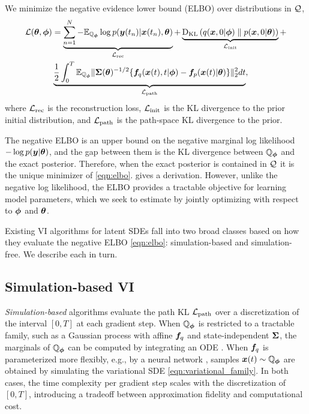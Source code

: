 We minimize the negative evidence lower bound (ELBO) over distributions in $\mathcal{Q}$,
\begin{equation}\label{eqn:elbo}
\begin{aligned}
   \mathcal{L}(\boldsymbol{\theta},\boldsymbol{\phi}) &= \underbrace{\sum_{n=1}^N {-}\mathbb{E}_{\mathbb{Q}_{\boldsymbol{\phi}}} \log p(\boldsymbol{y}(t_n) | \boldsymbol{x}(t_n), \boldsymbol{\theta})}_{\mathcal{L}_{\mathrm{rec}}} 
   + \underbrace{\textrm{D}_{\textrm{KL}}\left(q(\boldsymbol{x}, 0 | \boldsymbol{\phi})\;\|\;p(\boldsymbol{x}, 0 | \boldsymbol{\theta})\right)}_{\mathcal{L}_{\mathrm{init}}}  + \\
   &\underbrace{\frac{1}{2}\int_0^{T} \mathbb{E}_{\mathbb{Q}_{\boldsymbol{\phi}}} \|\boldsymbol{\Sigma}(\boldsymbol{\theta})^{-1/2}\{\boldsymbol{f}_q(\boldsymbol{x}(t), t | \boldsymbol{\phi}) - \boldsymbol{f}_p(\boldsymbol{x}(t)| \boldsymbol{\theta})\}\|_2^2 dt}_{\mathcal{L}_{\mathrm{path}}},
\end{aligned}
\end{equation}
where $\mathcal{L}_{\mathrm{rec}}$ is the reconstruction loss, $\mathcal{L}_{\mathrm{init}}$ is the KL divergence to the prior initial distribution, and $\mathcal{L}_{\mathrm{path}}$ is the path-space KL divergence to the prior.

The negative ELBO is an upper bound on the negative marginal log likelihood $-\log p(\boldsymbol{y} | \boldsymbol{\theta})$, and the gap between them is the KL divergence between $\mathbb{Q}_{\boldsymbol{\phi}}$ and the exact posterior.
Therefore, when the exact posterior is contained in $\mathcal{Q}$ it is the unique minimizer of \cref{eqn:elbo}.
 gives a derivation.
However, unlike the negative log likelihood, the ELBO provides a tractable objective for learning  model parameters, which we seek to estimate by jointly optimizing with respect to $\boldsymbol{\phi}$ and $\boldsymbol{\theta}$.

Existing VI algorithms for latent SDEs fall into two broad classes based on how they evaluate the negative ELBO \cref{eqn:elbo}: simulation-based and simulation-free.
We describe each in turn.

\subsection{Simulation-based VI}\label{subsec:sim-based}
\emph{Simulation-based} algorithms evaluate the path KL $\mathcal{L}_{\mathrm{path}}$ over a discretization of the interval $[0, T]$ at each gradient step. 
When $\mathbb{Q}_{\boldsymbol{\phi}}$ is restricted to a tractable family, such as a Gaussian process with affine $\boldsymbol{f}_q$ and state-independent $\boldsymbol{\Sigma}$, the marginals of $\mathbb{Q}_{\boldsymbol{\phi}}$ can be computed by integrating an ODE \cite{archambeau2007gaussian, hu2025sing,archambeau2007variational, duncker2019learning, verma2024variational, kohs2021variational, wildner2021moment,park2024amortized, parkstochastic2026}.
When $\boldsymbol{f}_q$ is parameterized more flexibly, e.g., by a neural network \cite{li2020scalable, ryder2018black, tzen2019neural, kidger2021efficient, oh2024stable}, samples $\boldsymbol{x}(t) \sim \mathbb{Q}_{\boldsymbol{\phi}}$ are obtained by simulating the variational SDE \eqref{eqn:variational_family}. 
In both cases, the time complexity per gradient step scales with the discretization of $[0, T]$, introducing a tradeoff between approximation fidelity and computational cost.


